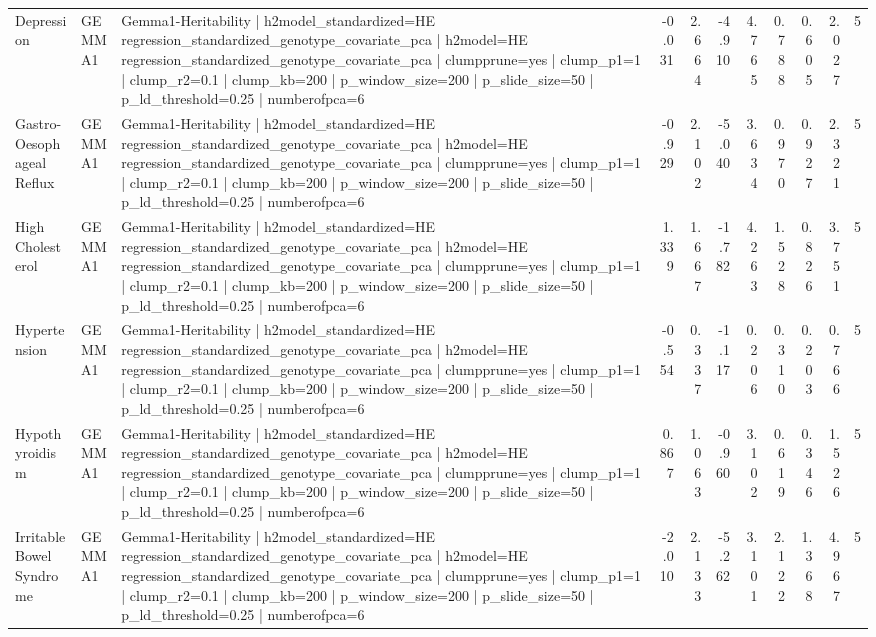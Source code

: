 \begin{landscape}
\begin{longtable}{p{2.4cm}p{1.8cm}p{6.0cm}rrrrrrrr}
Depression & GEMMA1 & Gemma1-Heritability | h2model\_standardized=HE regression\_standardized\_genotype\_covariate\_pca | h2model=HE regression\_standardized\_genotype\_covariate\_pca | clumpprune=yes | clump\_p1=1 | clump\_r2=0.1 | clump\_kb=200 | p\_window\_size=200 | p\_slide\_size=50 | p\_ld\_threshold=0.25 | numberofpca=6 & -0.031 & 2.664 & -4.910 & 4.765 & 0.788 & 0.605 & 2.027 & 5 \\
Gastro-Oesophageal Reflux & GEMMA1 & Gemma1-Heritability | h2model\_standardized=HE regression\_standardized\_genotype\_covariate\_pca | h2model=HE regression\_standardized\_genotype\_covariate\_pca | clumpprune=yes | clump\_p1=1 | clump\_r2=0.1 | clump\_kb=200 | p\_window\_size=200 | p\_slide\_size=50 | p\_ld\_threshold=0.25 | numberofpca=6 & -0.929 & 2.102 & -5.040 & 3.634 & 0.970 & 0.927 & 2.321 & 5 \\
High Cholesterol & GEMMA1 & Gemma1-Heritability | h2model\_standardized=HE regression\_standardized\_genotype\_covariate\_pca | h2model=HE regression\_standardized\_genotype\_covariate\_pca | clumpprune=yes | clump\_p1=1 | clump\_r2=0.1 | clump\_kb=200 | p\_window\_size=200 | p\_slide\_size=50 | p\_ld\_threshold=0.25 | numberofpca=6 & 1.339 & 1.667 & -1.782 & 4.263 & 1.528 & 0.826 & 3.751 & 5 \\
Hypertension & GEMMA1 & Gemma1-Heritability | h2model\_standardized=HE regression\_standardized\_genotype\_covariate\_pca | h2model=HE regression\_standardized\_genotype\_covariate\_pca | clumpprune=yes | clump\_p1=1 | clump\_r2=0.1 | clump\_kb=200 | p\_window\_size=200 | p\_slide\_size=50 | p\_ld\_threshold=0.25 | numberofpca=6 & -0.554 & 0.337 & -1.117 & 0.206 & 0.310 & 0.203 & 0.766 & 5 \\
Hypothyroidism & GEMMA1 & Gemma1-Heritability | h2model\_standardized=HE regression\_standardized\_genotype\_covariate\_pca | h2model=HE regression\_standardized\_genotype\_covariate\_pca | clumpprune=yes | clump\_p1=1 | clump\_r2=0.1 | clump\_kb=200 | p\_window\_size=200 | p\_slide\_size=50 | p\_ld\_threshold=0.25 | numberofpca=6 & 0.867 & 1.063 & -0.960 & 3.102 & 0.619 & 0.346 & 1.526 & 5 \\
Irritable Bowel Syndrome & GEMMA1 & Gemma1-Heritability | h2model\_standardized=HE regression\_standardized\_genotype\_covariate\_pca | h2model=HE regression\_standardized\_genotype\_covariate\_pca | clumpprune=yes | clump\_p1=1 | clump\_r2=0.1 | clump\_kb=200 | p\_window\_size=200 | p\_slide\_size=50 | p\_ld\_threshold=0.25 | numberofpca=6 & -2.010 & 2.133 & -5.262 & 3.101 & 2.122 & 1.368 & 4.967 & 5 \\

\end{longtable}
\end{landscape}
